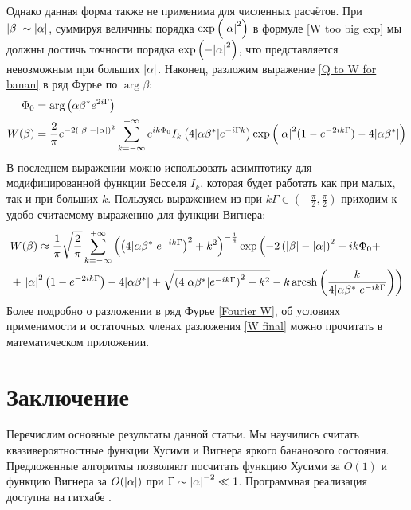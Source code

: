 \documentclass[a4paper, 12pt]{article}
\DeclareMathOperator*{\arcsh}{arcsh}
\newenvironment{eqw}{\begin{equation} \begin{aligned}}   
    {\end{aligned}    \end{equation}}
\begin{document}
Однако данная форма также не применима для численных расчётов. При $\abs{\beta}\sim\abs{\alpha}$, суммируя величины порядка $\exp\left(\abs{\alpha}^2\right)$ в формуле \ref{W too big exp} мы должны достичь точности порядка $\exp\left(-\abs{\alpha}^2\right)$, что представляется невозможным при больших $\abs{\alpha}$. Наконец, разложим выражение \ref{Q to W for banan} в ряд Фурье по $\arg{\beta}$:
\begin{eqw}\label{Fourier W}
    \Phi_0 &= \arg\left(\alpha\beta^* e^{2i\Gamma}\right)\\
     W(\beta) &= \frac{2}{\pi}e^{-2\left(\abs{\beta} - \abs{\alpha}\right)^2}
     \sum\limits_{k=-\infty}^{+\infty} e^{ik\Phi_0} I_{k}\left(4\abs{\alpha\beta^*}e^{-i\Gamma k}\right)
     \exp\left(\abs{\alpha}^2 (1-e^{-2ik\Gamma})-4\abs{\alpha\beta^*}\right)
\end{eqw}
В последнем выражении можно использовать асимптотику для модифицированной функции Бесселя $I_k$, которая будет работать как при малых, так и при больших $k$. Пользуясь выражением из \cite{bateman1953higher} при $k\Gamma\in\left(-\frac{\pi}{2}, \frac{\pi}{2}\right)$ приходим к удобо считаемому выражению для функции Вигнера:
\begin{eqw}\label{W final}
    &W(\beta) \approx \frac{1}{\pi}\sqrt{\frac{2}{\pi}}\sum\limits_{k=-\infty}^{+\infty} \left(\left(4\abs{\alpha\beta^*}e^{-ik\Gamma}\right)^2+k^2\right)^{-\frac{1}{4}}\exp\left(-2\left(\abs{\beta} - \abs{\alpha}\right)^2 + ik\Phi_0 + \right.\\
    &+\left.
    \abs{\alpha}^2\left(1-e^{-2ik\Gamma}\right)-4\abs{\alpha\beta^*}+
    \sqrt{\left(4\abs{\alpha\beta^*}e^{-ik\Gamma}\right)^2+k^2}-k\arcsh\left(\frac{k}{4\abs{\alpha\beta^*}e^{-ik\Gamma}}\right)\right)
\end{eqw}
Более подробно о разложении в ряд Фурье \ref{Fourier W}, об условиях применимости и остаточных членах разложения \ref{W final} можно прочитать в математическом приложении.
\section*{Заключение}
Перечислим основные результаты данной статьи. Мы научились считать квазивероятностные функции Хусими и Вигнера яркого бананового состояния. Предложенные алгоритмы позволяют посчитать функцию Хусими за $O(1)$ и функцию Вигнера за $O(\abs{\alpha})$ при $\Gamma\sim\abs{\alpha}^{-2}\ll1$. Программная реализация доступна на гитхабе \cite{mygit}.
\nocite{*}

\end{document}

